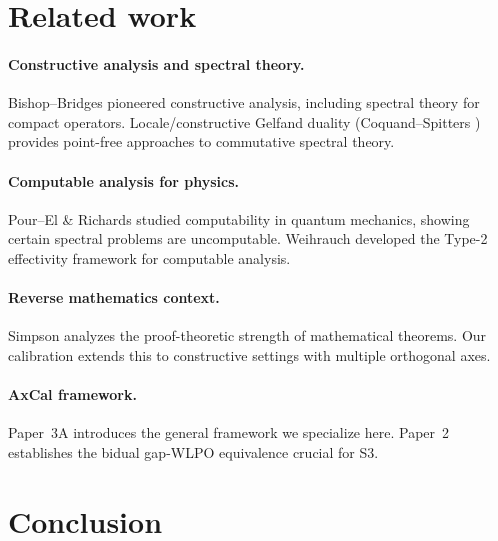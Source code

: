 \documentclass[11pt]{article}
\theoremstyle{plain}
\theoremstyle{definition}
\theoremstyle{remark}
\begin{document}
\section{Related work}

\paragraph{Constructive analysis and spectral theory.} 
Bishop--Bridges \cite{BishopBridges} pioneered constructive analysis, including spectral theory for compact operators. Locale/constructive Gelfand duality (Coquand--Spitters \cite{CoquandSpitters}) provides point-free approaches to commutative spectral theory.

\paragraph{Computable analysis for physics.} 
Pour--El \& Richards \cite{PourElRichards} studied computability in quantum mechanics, showing certain spectral problems are uncomputable. Weihrauch \cite{Weihrauch} developed the Type-2 effectivity framework for computable analysis.

\paragraph{Reverse mathematics context.} 
Simpson \cite{Simpson} analyzes the proof-theoretic strength of mathematical theorems. Our calibration extends this to constructive settings with multiple orthogonal axes.

\paragraph{AxCal framework.} 
Paper~3A \cite{Paper3A} introduces the general framework we specialize here. Paper~2 \cite{Paper2} establishes the bidual gap-WLPO equivalence crucial for S3.

\section{Conclusion}
\end{document}
